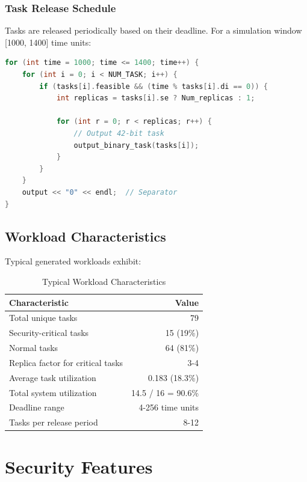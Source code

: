 \documentclass[12pt,a4paper]{article}
\begin{document}
\subsubsection{Task Release Schedule}

Tasks are released periodically based on their deadline. For a simulation window [1000, 1400] time units:

\begin{lstlisting}[language=C++, caption={Periodic Task Release}]
for (int time = 1000; time <= 1400; time++) {
    for (int i = 0; i < NUM_TASK; i++) {
        if (tasks[i].feasible && (time % tasks[i].di == 0)) {
            int replicas = tasks[i].se ? Num_replicas : 1;

            for (int r = 0; r < replicas; r++) {
                // Output 42-bit task
                output_binary_task(tasks[i]);
            }
        }
    }
    output << "0" << endl;  // Separator
}
\end{lstlisting}

\subsection{Workload Characteristics}

Typical generated workloads exhibit:

\begin{table}[H]
\centering
\begin{tabular}{|l|r|}
\hline
\textbf{Characteristic} & \textbf{Value} \\
\hline
Total unique tasks & 79 \\
Security-critical tasks & 15 (19\%) \\
Normal tasks & 64 (81\%) \\
Replica factor for critical tasks & 3-4 \\
Average task utilization & 0.183 (18.3\%) \\
Total system utilization & 14.5 / 16 = 90.6\% \\
Deadline range & 4-256 time units \\
Tasks per release period & 8-12 \\
\hline
\end{tabular}
\caption{Typical Workload Characteristics}
\end{table}

\section{Security Features}
\end{document}
